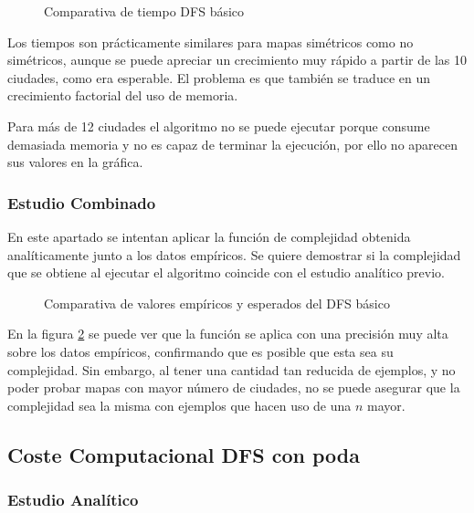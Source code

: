 \documentclass{uc3mpracticas}
\begin{document}
  \vspace{2mm}
  
  \begin{figure}[!h]
    \caption{Comparativa de tiempo DFS básico}
    \label{fig:compDFS}
  \end{figure}
  
  
  Los tiempos son prácticamente similares para mapas simétricos como no simétricos, aunque se puede apreciar un crecimiento muy rápido a partir de las 10 ciudades, como era esperable. El problema es que también se traduce en un crecimiento factorial del uso de memoria.

  \vspace{2mm}

  Para más de 12 ciudades el algoritmo no se puede ejecutar porque consume demasiada memoria y no es capaz de terminar la ejecución, por ello no aparecen sus valores en la gráfica.

  \subsubsection{Estudio Combinado}
  
  En este apartado se intentan aplicar la función de complejidad obtenida analíticamente junto a los datos empíricos. Se quiere demostrar si la complejidad que se obtiene al ejecutar el algoritmo coincide con el estudio analítico previo.

  \begin{figure}[!h]
    \caption{Comparativa de valores empíricos y esperados del DFS básico}
    \label{fig:comp_combDFS}
  \end{figure}

  En la figura \ref{fig:comp_combDFS} se puede ver que la función se aplica con una precisión muy alta sobre los datos empíricos, confirmando que es posible que esta sea su complejidad. Sin embargo, al tener una cantidad tan reducida de ejemplos, y no poder probar mapas con mayor número de ciudades, no se puede asegurar que la complejidad sea la misma con ejemplos que hacen uso de una $n$ mayor.
  

  \subsection{Coste Computacional DFS con poda}

  \subsubsection{Estudio Analítico}
\end{document}
